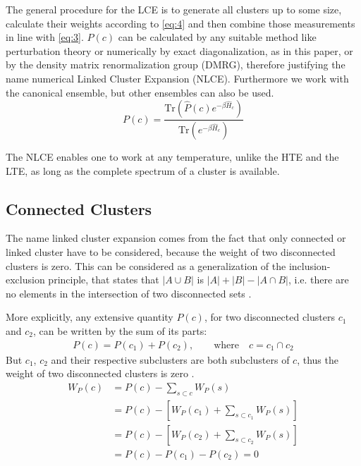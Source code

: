 \documentclass[a4paper,12pt]{article}
\begin{document}
The general procedure for the LCE is to generate all clusters up to
some size, calculate their weights according to \eqref{eq:4} and then combine those
measurements in line with \eqref{eq:3}. $P(c)$ can be calculated by
any suitable method like perturbation theory or numerically by exact
diagonalization, as in this paper, or by the density matrix
renormalization group (DMRG), therefore justifying the name
numerical Linked Cluster Expansion (NLCE). Furthermore we work with the canonical ensemble, but
other ensembles can also be used.
\begin{equation}
\label{eq:6}
P(c) = \frac{ \text{Tr} \left(\hat P(c) e^{-\beta \hat H_c} \right)}{ \text{Tr}
  \left(e^{-\beta \hat H_c} \right)}
\end{equation}

The NLCE enables one to work at any temperature, unlike the HTE and
the LTE, as long as the complete spectrum of a cluster is available.
\subsection{Connected Clusters}

The name linked cluster expansion comes from the fact that only
connected or linked cluster have to be considered, because the weight of two disconnected clusters is zero. This can be considered as a generalization of the
inclusion-exclusion principle, that states that $|A \cup B|$ is $|A|
+ |B| - |A \cap B|$, i.e. there are no elements in the intersection of
two disconnected sets \cite{Melko}.

More explicitly, any extensive quantity $P(c)$, for two disconnected
clusters $c_1$ and $c_2$, can be written by the sum of its parts:
\begin{align}
\label{eq:7}
P(c) = P(c_1) + P(c_2), \qquad \text{where} \quad c = c_1 \cap c_2
\end{align}
But $c_1$, $c_2$ and their respective subclusters are both
subclusters of $c$, thus the weight of two disconnected clusters is zero
\cite{Rigol}.
\begin{align}
\label{eq:8}
W_P(c) &= P(c) - \sum\limits_{s \subset c} W_P(s)\\
&= P(c) - \left[ W_P(c_1) + \sum\limits_{s \subset c_1} W_P(s)
  \right]\\
&= P(c) - \left[ W_P(c_2) + \sum\limits_{s \subset c_2} W_P(s)
  \right]\\
&= P(c) - P(c_1) -P(c_2) = 0
\end{align}
\end{document}
